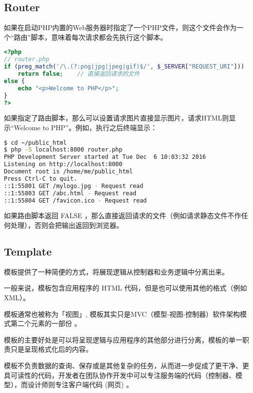 \subsection{Router}



如果在启动PHP内置的Web服务器时指定了一个PHP文件，则这个文件会作为一个“路由”脚本，意味着每次请求都会先执行这个脚本。





\begin{lstlisting}[language=PHP]
<?php
// router.php
if (preg_match('/\.(?:png|jpg|jpeg|gif)$/', $_SERVER["REQUEST_URI"]))
    return false;    // 直接返回请求的文件
else { 
    echo "<p>Welcome to PHP</p>";
}
?>
\end{lstlisting}


如果指定了路由脚本，那么可以设置请求图片直接显示图片，请求HTML则显示“Welcome to PHP”。例如，执行之后终端显示：


\begin{lstlisting}[language=bash]
$ cd ~/public_html
$ php -S localhost:8000 router.php
PHP Development Server started at Tue Dec  6 10:03:32 2016
Listening on http://localhost:8000
Document root is /home/me/public_html
Press Ctrl-C to quit.
::1:55801 GET /mylogo.jpg - Request read
::1:55803 GET /abc.html - Request read
::1:55804 GET /favicon.ico - Request read
\end{lstlisting}


如果路由脚本返回 FALSE ，那么直接返回请求的文件（例如请求静态文件不作任何处理），否则会把输出返回到浏览器。

\subsection{Template}

模板提供了一种简便的方式，将展现逻辑从控制器和业务逻辑中分离出来。


一般来说，模板包含应用程序的 HTML 代码，但是也可以使用其他的格式（例如 XML）。

模板通常也被称为「视图」, 模板其实只是MVC（模型-视图-控制器）软件架构模式第二个元素的一部份 。

模板的主要好处是可以将呈现逻辑与应用程序的其他部分进行分离，模板的单一职责只是呈现格式化后的内容。

模板不负责数据的查询、保存或是其他复杂的任务，从而进一步促成了更干净、更具可读性的代码，开发者在团队协作开发中可以专注服务端的代码（控制器、模型），而设计师则专注客户端代码 (网页) 。

